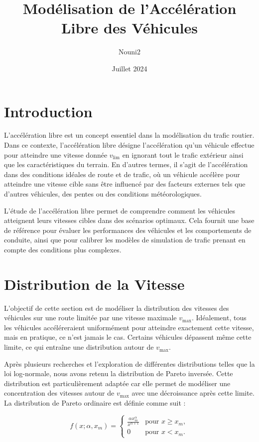 \documentclass{article}
\title{Modélisation de l'Accélération Libre des Véhicules}
\author{Nouni2}
\date{Juillet 2024}
\begin{document}
\maketitle


\section{Introduction}
L'accélération libre est un concept essentiel dans la modélisation du trafic routier. Dans ce contexte, l'accélération libre désigne l'accélération qu'un véhicule effectue pour atteindre une vitesse donnée \(v_{\text{lim}}\) en ignorant tout le trafic extérieur ainsi que les caractéristiques du terrain. En d'autres termes, il s'agit de l'accélération dans des conditions idéales de route et de trafic, où un véhicule accélère pour atteindre une vitesse cible sans être influencé par des facteurs externes tels que d'autres véhicules, des pentes ou des conditions météorologiques.

L'étude de l'accélération libre permet de comprendre comment les véhicules atteignent leurs vitesses cibles dans des scénarios optimaux. Cela fournit une base de référence pour évaluer les performances des véhicules et les comportements de conduite, ainsi que pour calibrer les modèles de simulation de trafic prenant en compte des conditions plus complexes.

\section{Distribution de la Vitesse}

L'objectif de cette section est de modéliser la distribution des vitesses des véhicules sur une route limitée par une vitesse maximale \(v_{\text{max}}\). Idéalement, tous les véhicules accéléreraient uniformément pour atteindre exactement cette vitesse, mais en pratique, ce n'est jamais le cas. Certains véhicules dépassent même cette limite, ce qui entraîne une distribution autour de \(v_{\text{max}}\). 

Après plusieurs recherches et l'exploration de différentes distributions telles que la loi log-normale, nous avons retenu la distribution de Pareto inversée. Cette distribution est particulièrement adaptée car elle permet de modéliser une concentration des vitesses autour de \(v_{\text{max}}\) avec une décroissance après cette limite. La distribution de Pareto ordinaire est définie comme suit :

\[ 
f(x; \alpha, x_m) = \begin{cases} 
\frac{\alpha x_m^\alpha}{x^{\alpha+1}} & \text{pour } x \geq x_m, \\
0 & \text{pour } x < x_m.
\end{cases} 
\]
\end{document}

